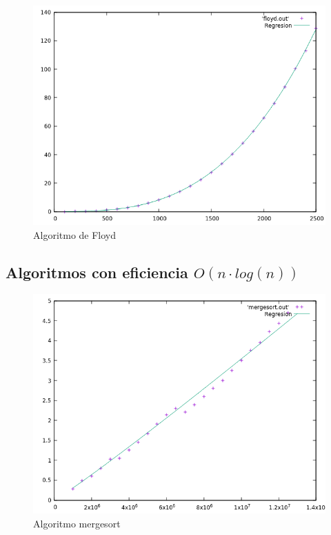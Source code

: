 \documentclass[12pt,spanish]{article}
\begin{document}
\begin{figure}[H]
\centering
\includegraphics[scale=0.75]{hibrida_floyd.png}
\caption{Algoritmo de Floyd}
\end{figure}

\subsection{Algoritmos con eficiencia $O(n \cdot log(n))$}

\begin{figure}[H]
\centering
\includegraphics[scale=0.75]{hibrida_mergesort.png}
\caption{Algoritmo mergesort}
\end{figure}
\end{document}
